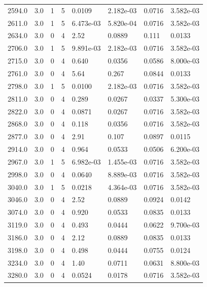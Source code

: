 \documentclass[preview]{standalone}
\begin{document}
{{{\begin{tabular}{L{1.2cm}C{1.2cm} C{0.3cm}C{0.5cm} C{1.4cm}C{1.4cm} C{1.4cm}C{1.4cm}}
  2594.0  &   3.0  & 1     &  5 &  0.0109  & 2.182e-03  & 0.0716 &  3.582e-03   \\ 
  2611.0  &   3.0  & 1     &  5 &  6.473e-03  & 5.820e-04  & 0.0716 &  3.582e-03   \\ 
  2634.0  &   3.0  & 0     &  4 &  2.52  & 0.0889  & 0.111 &  0.0133   \\ 
  2706.0  &   3.0  & 1     &  5 &  9.891e-03  & 2.182e-03  & 0.0716 &  3.582e-03   \\ 
  2715.0  &   3.0  & 0     &  4 &  0.640  & 0.0356  & 0.0586 &  8.000e-03   \\ 
  2761.0  &   3.0  & 0     &  4 &  5.64  & 0.267  & 0.0844 &  0.0133   \\ 
  2798.0  &   3.0  & 1     &  5 &  0.0100  & 2.182e-03  & 0.0716 &  3.582e-03   \\ 
  2811.0  &   3.0  & 0     &  4 &  0.289  & 0.0267  & 0.0337 &  5.300e-03   \\ 
  2822.0  &   3.0  & 0     &  4 &  0.0871  & 0.0267  & 0.0716 &  3.582e-03   \\ 
  2868.0  &   3.0  & 0     &  4 &  0.118  & 0.0356  & 0.0716 &  3.582e-03   \\ 
  2877.0  &   3.0  & 0     &  4 &  2.91  & 0.107  & 0.0897 &  0.0115   \\ 
  2914.0  &   3.0  & 0     &  4 &  0.964  & 0.0533  & 0.0506 &  6.200e-03   \\ 
  2967.0  &   3.0  & 1     &  5 &  6.982e-03  & 1.455e-03  & 0.0716 &  3.582e-03   \\ 
  2998.0  &   3.0  & 0     &  4 &  0.0640  & 8.889e-03  & 0.0716 &  3.582e-03   \\ 
  3040.0  &   3.0  & 1     &  5 &  0.0218  & 4.364e-03  & 0.0716 &  3.582e-03   \\ 
  3046.0  &   3.0  & 0     &  4 &  2.52  & 0.0889  & 0.0924 &  0.0142   \\ 
  3074.0  &   3.0  & 0     &  4 &  0.920  & 0.0533  & 0.0835 &  0.0133   \\ 
  3119.0  &   3.0  & 0     &  4 &  0.493  & 0.0444  & 0.0622 &  9.700e-03   \\ 
  3186.0  &   3.0  & 0     &  4 &  2.12  & 0.0889  & 0.0835 &  0.0133   \\ 
  3198.0  &   3.0  & 0     &  4 &  0.498  & 0.0444  & 0.0755 &  0.0124   \\ 
  3234.0  &   3.0  & 0     &  4 &  1.40  & 0.0711  & 0.0631 &  8.800e-03   \\ 
  3280.0  &   3.0  & 0     &  4 &  0.0524  & 0.0178  & 0.0716 &  3.582e-03   \\ 

\end{tabular}}}}
\end{document}
